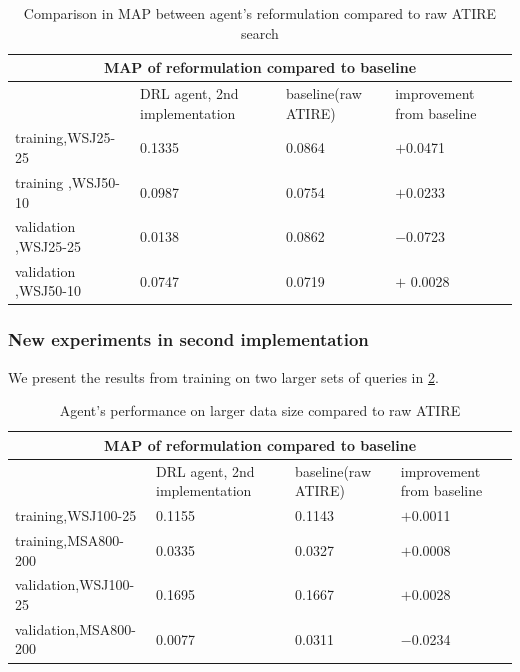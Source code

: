 \begin{table}[H]
	
	\begin{tabular}{ |p{4cm}||p{3cm}|p{3cm}|p{3cm}|  }
		\hline
		\multicolumn{4}{|c|}{MAP of reformulation compared to baseline} \\
		
		\hline
		& DRL agent, 2nd implementation               &baseline(raw ATIRE)& improvement from baseline\\
		\hline
		training,WSJ25-25    &0.1335                        &0.0864           & $+$0.0471\\
		training ,WSJ50-10    & 0.0987                       & 0.0754         & $+$0.0233\\
		
		\hline
		validation ,WSJ25-25 &0.0138                       &  0.0862           &$-$0.0723           \\
		validation ,WSJ50-10 & 0.0747                      & 0.0719           & $+$ 0.0028     \\
		\hline
	\end{tabular}
	\caption{\label{tab:MAP_of_splits_small}Comparison in MAP between agent's reformulation compared to raw ATIRE search}
\end{table}





\subsubsection{New experiments in second implementation}

We present the results from training on two larger sets of queries in \ref{tab:MAP_of_splits_sys2}. 


\begin{table}[H]
	
	\begin{tabular}{ |p{4cm}||p{3cm}|p{3cm}|p{3cm}|  }
		\hline
		\multicolumn{4}{|c|}{MAP of reformulation compared to baseline} \\
		
		\hline
		& DRL agent, 2nd implementation               &baseline(raw ATIRE)& improvement from baseline\\
		\hline
		training,WSJ100-25    	&0.1155                       &0.1143         & $+$0.0011\\
		training,MSA800-200    &0.0335                       &0.0327       	& $+$0.0008\\
		
		\hline
		validation,WSJ100-25  	&0.1695                    	 & 0.1667         &$+$0.0028\\
		validation,MSA800-200 &0.0077                   	 &0.0311        & $-$0.0234 \\
		\hline
	\end{tabular}
	\caption{\label{tab:MAP_of_splits_sys2}Agent's performance on larger data size compared to raw ATIRE}
\end{table}


